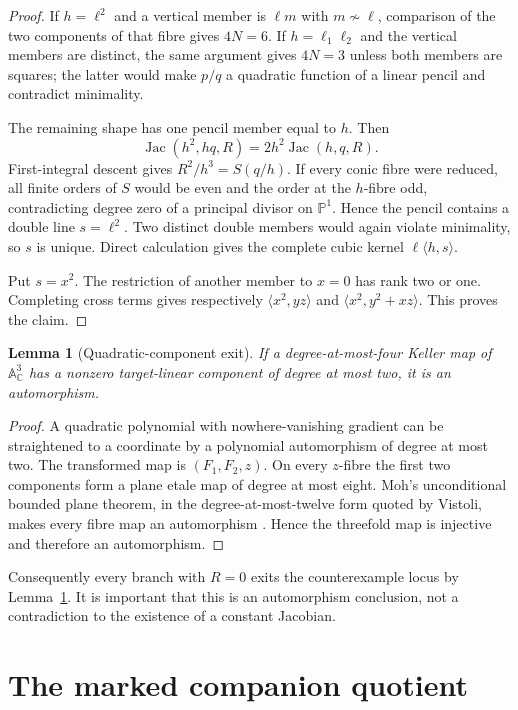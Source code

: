 \documentclass[11pt]{article}
\newtheorem{lemma}[theorem]{Lemma}
\theoremstyle{remark}
\newcommand{\A}{\mathbb A}
\newcommand{\C}{\mathbb C}
\newcommand{\PP}{\mathbb P}
\newcommand{\Jac}{\operatorname{Jac}}
\begin{document}
\begin{proof}
If $h=\ell^2$ and a vertical member is $\ell m$ with
$m\not\sim\ell$, comparison of the two components of that fibre gives
$4N=6$.  If $h=\ell_1\ell_2$ and the vertical members are distinct, the
same argument gives $4N=3$ unless both members are squares; the latter
would make $p/q$ a quadratic function of a linear pencil and contradict
minimality.

The remaining shape has one pencil member equal to $h$.  Then
\[
\Jac(h^2,hq,R)=2h^2\Jac(h,q,R).
\]
First-integral descent gives $R^2/h^3=S(q/h)$.  If every conic fibre were
reduced, all finite orders of $S$ would be even and the order at the
$h$-fibre odd, contradicting degree zero of a principal divisor on
$\PP^1$.  Hence the pencil contains a double line $s=\ell^2$.
Two distinct double members would again violate minimality, so $s$ is
unique.  Direct calculation gives the complete cubic kernel
$\ell\langle h,s\rangle$.

Put $s=x^2$.  The restriction of another member to $x=0$ has rank two or
one.  Completing cross terms gives respectively
$\langle x^2,yz\rangle$ and
$\langle x^2,y^2+xz\rangle$.  This proves the claim.
\end{proof}

\begin{lemma}[Quadratic-component exit]\label{lem:exit}
If a degree-at-most-four Keller map of $\A^3_\C$ has a nonzero
target-linear component of degree at most two, it is an automorphism.
\end{lemma}

\begin{proof}
A quadratic polynomial with nowhere-vanishing gradient can be straightened
to a coordinate by a polynomial automorphism of degree at most two.
The transformed map is $(F_1,F_2,z)$.  On every $z$-fibre the first two
components form a plane etale map of degree at most eight.  Moh's
unconditional bounded plane theorem, in the degree-at-most-twelve form
quoted by Vistoli, makes every fibre map an automorphism
\cite{Moh,Vistoli}.  Hence the threefold map is injective and therefore an
automorphism.
\end{proof}

Consequently every branch with $R=0$ exits the counterexample locus by
Lemma~\ref{lem:exit}.  It is important that this is an automorphism
conclusion, not a contradiction to the existence of a constant Jacobian.

\section{The marked companion quotient}
\end{document}

